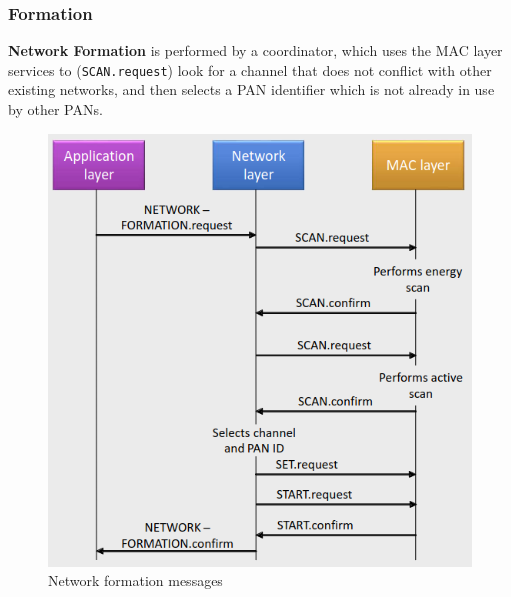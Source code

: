 \subsubsection{Formation}
\begin{paracol}{2}
   \colfill
   \textbf{Network Formation} is performed by a coordinator, which uses the MAC layer services to (\texttt{SCAN.request}) look for a channel that does not conflict with other existing networks, and then selects a PAN identifier which is not already in use by other PANs.
   \colfill
   \switchcolumn
   \begin{figure}[htbp]
      \centering
      \includegraphics{images/zigbee_netformation.png}
      \caption{Network formation messages}
      \label{fig:zigbee_netformation}
   \end{figure}
\end{paracol}

